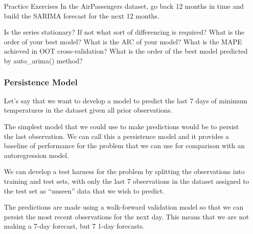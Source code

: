 \documentclass[11pt]{article}
\makeatletter
\newcommand{\boxspacing}{\kern\kvtcb@left@rule\kern\kvtcb@boxsep}
\newcommand{\prompt}[4]{
        \ttfamily\llap{{\color{#2}[#3]:\hspace{3pt}#4}}\vspace{-\baselineskip}
    }
\makeatother
\begin{document}
    \begin{tcolorbox}[breakable, size=fbox, boxrule=1pt, pad at break*=1mm,colback=cellbackground, colframe=cellborder]
\prompt{In}{incolor}{ }{\boxspacing}
\begin{Verbatim}[commandchars=\\\{\}]

\end{Verbatim}
\end{tcolorbox}

    Practice Exercises In the AirPassengers dataset, go back 12 months in
time and build the SARIMA forecast for the next 12 months.

Is the series stationary? If not what sort of differencing is required?
What is the order of your best model? What is the AIC of your model?
What is the MAPE achieved in OOT cross-validation? What is the order of
the best model predicted by auto\_arima() method?

    \hypertarget{persistence-model}{%
\subsubsection{Persistence Model}\label{persistence-model}}

Let's say that we want to develop a model to predict the last 7 days of
minimum temperatures in the dataset given all prior observations.

The simplest model that we could use to make predictions would be to
persist the last observation. We can call this a persistence model and
it provides a baseline of performance for the problem that we can use
for comparison with an autoregression model.

We can develop a test harness for the problem by splitting the
observations into training and test sets, with only the last 7
observations in the dataset assigned to the test set as ``unseen'' data
that we wish to predict.

The predictions are made using a walk-forward validation model so that
we can persist the most recent observations for the next day. This means
that we are not making a 7-day forecast, but 7 1-day forecasts.
\end{document}
